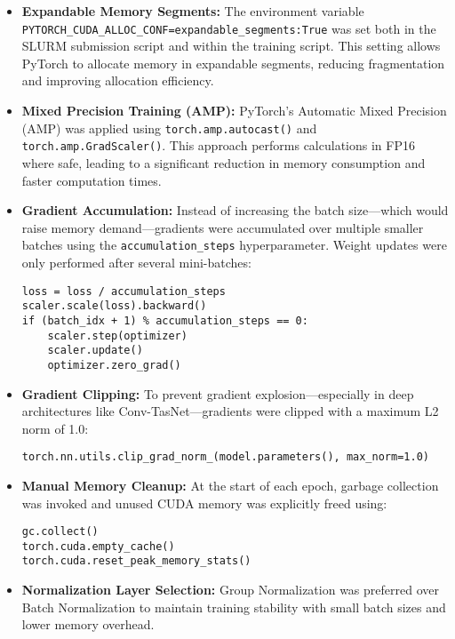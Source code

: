 \begin{itemize}
    \item \textbf{Expandable Memory Segments:} The environment variable \texttt{PYTORCH\_CUDA\_ALLOC\_CONF=expandable\_segments:True} was set both in the SLURM submission script and within the training script. This setting allows PyTorch to allocate memory in expandable segments, reducing fragmentation and improving allocation efficiency.

    \item \textbf{Mixed Precision Training (AMP):} PyTorch's Automatic Mixed Precision (AMP) was applied using \texttt{torch.amp.autocast()} and \texttt{torch.amp.GradScaler()}. This approach performs calculations in FP16 where safe, leading to a significant reduction in memory consumption and faster computation times.

    \item \textbf{Gradient Accumulation:} Instead of increasing the batch size—which would raise memory demand—gradients were accumulated over multiple smaller batches using the \texttt{accumulation\_steps} hyperparameter. Weight updates were only performed after several mini-batches:
    \begin{verbatim}
loss = loss / accumulation_steps
scaler.scale(loss).backward()
if (batch_idx + 1) % accumulation_steps == 0:
    scaler.step(optimizer)
    scaler.update()
    optimizer.zero_grad()
    \end{verbatim}

    \item \textbf{Gradient Clipping:} To prevent gradient explosion—especially in deep architectures like Conv-TasNet—gradients were clipped with a maximum L2 norm of 1.0:
    \begin{verbatim}
torch.nn.utils.clip_grad_norm_(model.parameters(), max_norm=1.0)
    \end{verbatim}

    \item \textbf{Manual Memory Cleanup:} At the start of each epoch, garbage collection was invoked and unused CUDA memory was explicitly freed using:
    \begin{verbatim}
gc.collect()
torch.cuda.empty_cache()
torch.cuda.reset_peak_memory_stats()
    \end{verbatim}

    \item \textbf{Normalization Layer Selection:} Group Normalization was preferred over Batch Normalization to maintain training stability with small batch sizes and lower memory overhead.


\end{itemize}
